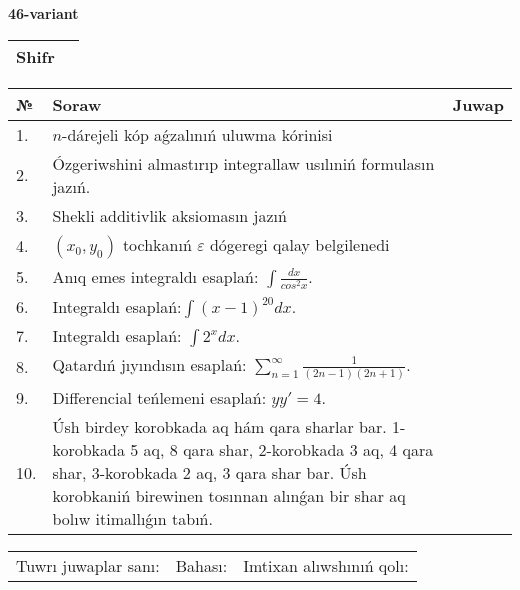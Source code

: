 \documentclass{article}
\begin{document}
  \egroup
  
  \newpage
  
  
  \textbf{46-variant}\\
  
  \bgroup
  \def\arraystretch{1.6} %
  
  \begin{tabular}{|m{5.7cm}|m{9.5cm}|}
  \hline
  Shifr & \\
  \hline
  \end{tabular}
  
  \vspace{1cm}
  
  \begin{tabular}{|m{0.7cm}|m{10cm}|m{4cm}|}
  \hline
  № & Soraw & Juwap \\
  \hline
  1. & \(n\)-dárejeli kóp aǵzalınıń uluwma kórinisi &  \\
  \hline
  2. & Ózgeriwshini almastırıp integrallaw usılıniń formulasın jazıń. &  \\
  \hline
  3. & Shekli additivlik aksiomasın jazıń &  \\
  \hline
  4. & \((x_0,y_0)\) tochkanıń \(\varepsilon\) dógeregi qalay belgilenedi &  \\
  \hline
  5. & Anıq emes integraldı esaplań: \(\int\frac{dx}{cos^2 x}\). &  \\
  \hline
  6. & Integraldı esaplań:\(\int{(x - 1)^{20}}dx\). &  \\
  \hline
  7. & Integraldı esaplań: \(\int{2^{x}dx}\). &  \\
  \hline
  8. & Qatardıń jıyındısın esaplań: \(\sum_{n = 1}^{\infty}\frac{1}{(2n - 1)(2n + 1)}\). &  \\
  \hline
  9. & Differencial teńlemeni esaplań: \(yy' = 4\). &  \\
  \hline
  10. & Úsh birdey korobkada aq hám qara sharlar bar. 1-korobkada 5 aq, 8 qara shar, 2-korobkada 3 aq, 4 qara shar, 3-korobkada 2 aq, 3 qara shar bar. Úsh korobkaniń birewinen tosınnan alınǵan bir shar aq bolıw itimallıǵın tabıń. &  \\
  \hline
  \end{tabular}
  
  \vspace{1cm}
  
  \begin{tabular}{lll}
  Tuwrı juwaplar sanı: \underline{\hspace{1.5cm}} & 
  Bahası: \underline{\hspace{1.5cm}} & 
  Imtixan alıwshınıń qolı: \underline{\hspace{2cm}} \\
  \end{tabular}
  
\end{document}
